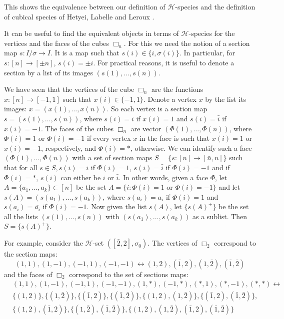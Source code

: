 \documentclass[11pt,reqno]{amsart}
\numberwithin{equation}{section}
\def\H{{\mathcal{H}}}
\def\sn{s\colon [n]\rightarrow [\bar{n},n]}
\def\seI{s\colon I/\sigma\rightarrow I}
\begin{document}
This shows the equivalence between our definition of $\H$-species and the definition of cubical species of Hetyei, Labelle and Leroux \cite{HLL}. 

It can be useful to find the equivalent objects in terms of $\H$-species for the vertices and the faces of the cubes $\Box_n$. For this we need the notion of a section map $\seI$. It is a map such that $s(i)\in \{i,\sigma(i)\}$. In particular, for $s\colon [n]\rightarrow [\pm n]$, $s(i)=\pm i$. For practical reasons, it is useful to denote a section by a list of its images $(s(1),\dots,s(n))$.

We have seen that the vertices of the cube $\Box_n$ are the functions $x\colon [n]\rightarrow [-1,1]$ such that $x(i)\in \{-1,1\}$. Denote a vertex $x$ by the list its images: $x=(x(1),\dots,x(n))$. So each vertex is a section map $s=(s(1),\dots,s(n))$, where $s(i)=i$ if $x(i)=1$ and $s(i)=\bar{i}$ if $x(i)=-1$. The faces of the cubes $\Box_n$ are vector $(\Phi(1),\dots, \Phi(n))$, where $\Phi(i)=1$ or $\Phi(i)=-1$ if every vertex $x$ in the face is such that $x(i)=1$ or $x(i)=-1$, respectively, and $\Phi(i)=\ast$, otherwise. We can identify such a face $(\Phi(1),\dots, \Phi(n))$ with a set of section maps $S=\{\sn\}$ such that for all $s\in S, s(i)=i$ if $\Phi(i)=1$, $s(i)=\bar{i}$ if $\Phi(i)=-1$ and if $\Phi(i)=\ast$, $s(i)$ can either be $i$ or $\bar{i}$. In other words, given a face $\Phi$, let $A=\{a_1,\dots,a_k\}\subset [n]$ be the set $A=\{i:\Phi(i)=1 \text{ or } \Phi(i)=-1\}$ and let $s(A)=(s(a_1),\dots,s(a_k))$, where $s(a_i)=a_i$ if $\Phi(i)=1$ and $s(a_i)=\overline{a_i}$ if $\Phi(i)=-1$. Now given the list $s(A)$, let $\{s(A)^+\}$ be the set all the lists $(s(1),\dots,s(n))$ with $(s(a_1),\dots,s(a_k))$ as a sublist. Then $S=\{s(A)^+\}$.

For example, consider the $\H$-set $([\bar{2},2],\sigma_0)$. The vertices of $\Box_2$ correspond to the section maps: 
$$(1,1),(1,-1),(-1,1),(-1,-1)\leftrightarrow (1,2),(\bar{1},2),(1,\bar{2}),(\bar{1},\bar{2})$$
and the faces of $\Box_2$ correspond to the set of sections maps:
\begin{equation*}
\begin{aligned} 
& (1,1),(1,-1),(-1,1),(-1,-1),(1,\ast),(-1,\ast),(\ast,1),(\ast,-1),(\ast,\ast) \leftrightarrow \\
& \{(1,2)\}, \{(1,\bar{2})\}, \{(\bar{1},2)\}, \{(\bar{1},\bar{2})\}, \{(1,2), (1,\bar{2})\}, \{(\bar{1},2), (\bar{1},\bar{2})\},\\
& \{(1,2),(\bar{1},2)\}, \{(1,\bar{2}),(\bar{1},\bar{2})\}, \{(1,2), (1,\bar{2}), (\bar{1},2), (\bar{1},\bar{2})\}
 \end{aligned}
 \end{equation*}
\end{document}
